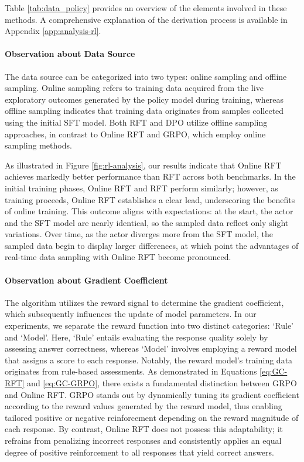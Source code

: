 \begin{itemize}[topsep=0pt]
\begin{itemize}[topsep=0pt]
Table \ref{tab:data_policy} provides an overview of the elements involved in these methods. A comprehensive explanation of the derivation process is available in Appendix \ref{app:analysis-rl}.

\paragraph{Observation about Data Source} The data source can be categorized into two types: online sampling and offline sampling. Online sampling refers to training data acquired from the live exploratory outcomes generated by the policy model during training, whereas offline sampling indicates that training data originates from samples collected using the initial SFT model. Both RFT and DPO utilize offline sampling approaches, in contrast to Online RFT and GRPO, which employ online sampling methods.

As illustrated in Figure \ref{fig:rl-analysis}, our results indicate that Online RFT achieves markedly better performance than RFT across both benchmarks. In the initial training phases, Online RFT and RFT perform similarly; however, as training proceeds, Online RFT establishes a clear lead, underscoring the benefits of online training. This outcome aligns with expectations: at the start, the actor and the SFT model are nearly identical, so the sampled data reflect only slight variations. Over time, as the actor diverges more from the SFT model, the sampled data begin to display larger differences, at which point the advantages of real-time data sampling with Online RFT become pronounced.

\paragraph{Observation about Gradient Coefficient} The algorithm utilizes the reward signal to determine the gradient coefficient, which subsequently influences the update of model parameters. In our experiments, we separate the reward function into two distinct categories: `Rule' and `Model'. Here, `Rule' entails evaluating the response quality solely by assessing answer correctness, whereas `Model' involves employing a reward model that assigns a score to each response. Notably, the reward model's training data originates from rule-based assessments. As demonstrated in Equations \ref{eq:GC-RFT} and \ref{eq:GC-GRPO}, there exists a fundamental distinction between GRPO and Online RFT. GRPO stands out by dynamically tuning its gradient coefficient according to the reward values generated by the reward model, thus enabling tailored positive or negative reinforcement depending on the reward magnitude of each response. By contrast, Online RFT does not possess this adaptability; it refrains from penalizing incorrect responses and consistently applies an equal degree of positive reinforcement to all responses that yield correct answers.


\end{itemize}
\end{itemize}
